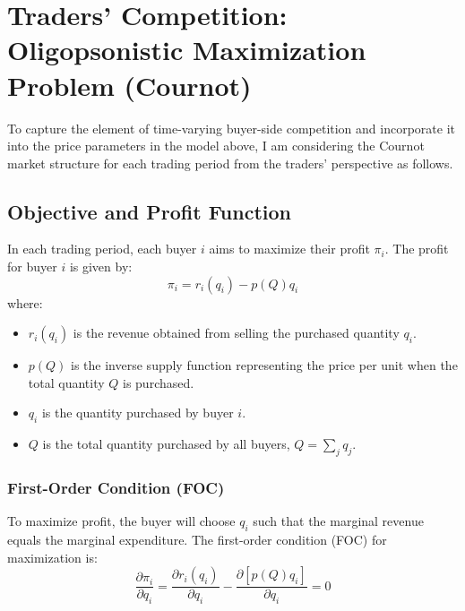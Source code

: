 \documentclass[12pt]{article}
\begin{document}
\newpage
\section{Traders' Competition: Oligopsonistic Maximization Problem (Cournot)}

To capture the element of time-varying buyer-side competition and incorporate it into the price parameters in the model above, I am considering the Cournot market structure for each trading period from the traders' perspective as follows. 

\subsection{Objective and Profit Function}
In each trading period, each buyer \( i \) aims to maximize their profit \( \pi_i \). The profit for buyer \( i \) is given by:
\begin{equation}
\pi_i = r_i(q_i) - p(Q) q_i
\end{equation}
where:
\begin{itemize}
  \item \( r_i(q_i) \) is the revenue obtained from selling the purchased quantity \( q_i \).
  \item \( p(Q) \) is the inverse supply function representing the price per unit when the total quantity \( Q \) is purchased.
  \item \( q_i \) is the quantity purchased by buyer \( i \).
  \item \( Q \) is the total quantity purchased by all buyers, \( Q = \sum_{j} q_j \).
\end{itemize}

\subsubsection{First-Order Condition (FOC)}
To maximize profit, the buyer will choose \( q_i \) such that the marginal revenue equals the marginal expenditure. The first-order condition (FOC) for maximization is:
\begin{equation}
\frac{\partial \pi_i}{\partial q_i} = \frac{\partial r_i(q_i)}{\partial q_i} - \frac{\partial [p(Q) q_i]}{\partial q_i} = 0
\end{equation}
\end{document}
